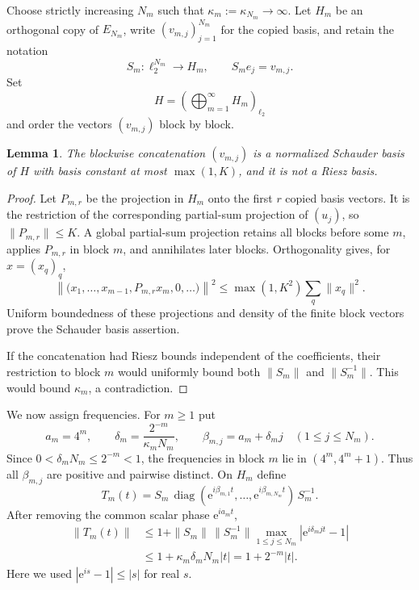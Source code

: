 \documentclass[11pt]{article}
\newtheorem{lemma}{Lemma}
\newcommand{\e}{\mathrm e}
\begin{document}
Choose strictly increasing $N_m$ such that
$\kappa_m:=\kappa_{N_m}\to\infty$.  Let $H_m$ be an orthogonal copy of
$E_{N_m}$, write $(v_{m,j})_{j=1}^{N_m}$ for the copied basis, and retain the
notation
\[
 S_m:\ell_2^{N_m}\longrightarrow H_m,\qquad S_m e_j=v_{m,j}.
\]
Set
\[
                  H=\left(\bigoplus_{m=1}^{\infty}H_m\right)_{\ell_2}
\]
and order the vectors $(v_{m,j})$ block by block.

\begin{lemma}\label{lem:basis}
The blockwise concatenation $(v_{m,j})$ is a normalized Schauder basis of $H$
with basis constant at most $\max(1,K)$, and it is not a Riesz basis.
\end{lemma}

\begin{proof}
Let $P_{m,r}$ be the projection in $H_m$ onto the first $r$ copied basis
vectors.  It is the restriction of the corresponding partial-sum projection
of $(u_j)$, so $\|P_{m,r}\|\le K$.  A global partial-sum projection retains
all blocks before some $m$, applies $P_{m,r}$ in block $m$, and annihilates
later blocks.  Orthogonality gives, for $x=(x_q)_q$,
\[
 \left\|\big(x_1,\ldots,x_{m-1},P_{m,r}x_m,0,\ldots\big)\right\|^2
 \le \max(1,K^2)\sum_q\|x_q\|^2.
\]
Uniform boundedness of these projections and density of the finite block
vectors prove the Schauder basis assertion.

If the concatenation had Riesz bounds independent of the coefficients, their
restriction to block $m$ would uniformly bound both $\|S_m\|$ and
$\|S_m^{-1}\|$.  This would bound $\kappa_m$, a contradiction.
\end{proof}

We now assign frequencies.  For $m\ge1$ put
\[
 a_m=4^m,
 \qquad
 \delta_m=\frac{2^{-m}}{\kappa_m N_m},
 \qquad
 \beta_{m,j}=a_m+\delta_m j\quad(1\le j\le N_m).
\]
Since $0<\delta_mN_m\le2^{-m}<1$, the frequencies in block $m$ lie in
$(4^m,4^m+1)$.  Thus all $\beta_{m,j}$ are positive and pairwise distinct.
On $H_m$ define
\[
 T_m(t)=S_m\,\operatorname{diag}
       (\e^{i\beta_{m,1}t},\ldots,\e^{i\beta_{m,N_m}t})\,S_m^{-1}.
\]
After removing the common scalar phase $\e^{ia_mt}$,
\begin{align*}
 \|T_m(t)\|
 &\le 1+\|S_m\|\,\|S_m^{-1}\|
        \max_{1\le j\le N_m}|\e^{i\delta_mjt}-1|\\
 &\le 1+\kappa_m\delta_mN_m|t|
  =1+2^{-m}|t|.                                      \tag{1}\label{eq:block}
\end{align*}
Here we used $|\e^{is}-1|\le |s|$ for real $s$.
\end{document}
